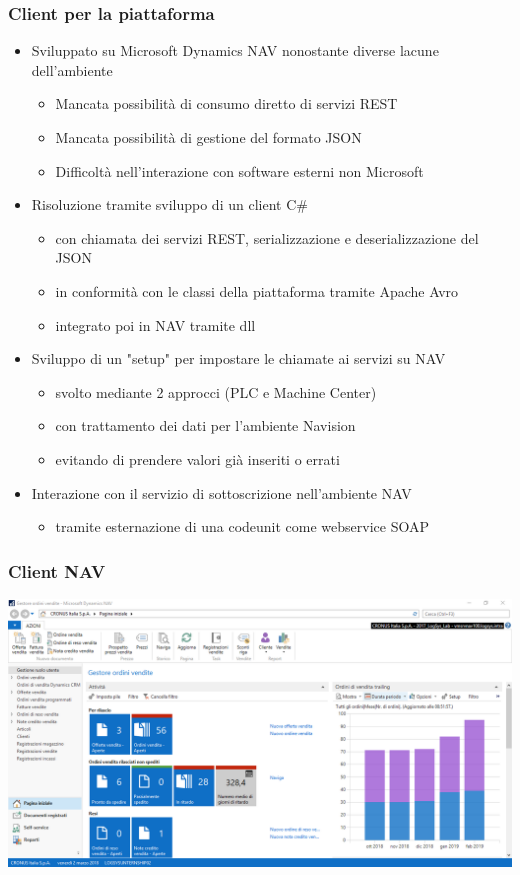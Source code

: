 \documentclass{beamer}
\begin{document}
\begin{frame}
\frametitle{Client per la piattaforma}
\begin{itemize}
	\item Sviluppato su Microsoft Dynamics NAV nonostante diverse lacune dell'ambiente
	\begin{itemize}
		\item Mancata possibilità di consumo diretto di servizi REST
		\item Mancata possibilità di gestione del formato JSON
		\item Difficoltà nell'interazione con software esterni non Microsoft
	\end{itemize}
	\item Risoluzione tramite sviluppo di un client C\#
	\begin{itemize}
		\item con chiamata dei servizi REST, serializzazione e deserializzazione del JSON
		\item in conformità con le classi della piattaforma tramite Apache Avro
		\item integrato poi in NAV tramite dll 
	\end{itemize}
	\item Sviluppo di un "setup" per impostare le chiamate ai servizi su NAV
	\begin{itemize}
		\item svolto mediante 2 approcci (PLC e Machine Center)
		\item con trattamento dei dati per l'ambiente Navision
		\item evitando di prendere valori già inseriti o errati
	\end{itemize}

	\item Interazione con il servizio di sottoscrizione nell'ambiente NAV
	\begin{itemize}
		\item tramite esternazione di una codeunit come webservice SOAP
	\end{itemize}
\end{itemize}
\end{frame}
\begin{frame}
\frametitle{Client NAV}
\includegraphics[width=1\textwidth]{images/NAVClient.png}
\end{frame}
\end{document}
